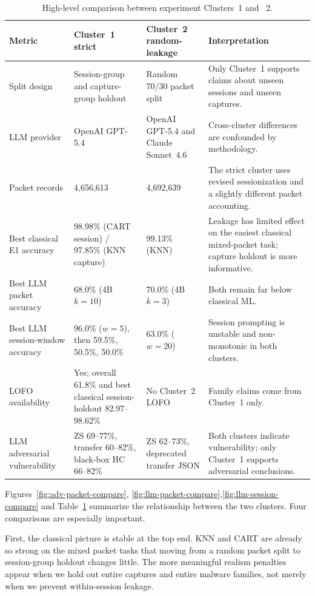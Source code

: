 \documentclass[letterpaper,twocolumn,10pt]{article}
\begin{document}
\begin{table}[t]
\centering
\caption{High-level comparison between experiment Clusters~1 and ~2.}
\label{tab:cluster-compare}
\footnotesize
\begin{tabularx}{\textwidth}{p{3.2cm}p{3.0cm}p{3.0cm}X}
\toprule
Metric & Cluster~1 strict & Cluster~2 random-leakage & Interpretation \\
\midrule
Split design & Session-group and capture-group holdout & Random 70/30 packet split & Only Cluster~1 supports claims about unseen sessions and unseen captures. \\
LLM provider & OpenAI GPT-5.4 & {OpenAI GPT-5.4 and Claude Sonnet~4.6} & Cross-cluster differences are confounded by methodology. \\
Packet records & 4{,}656{,}613 & 4{,}692{,}639 & The strict cluster uses revised sessionization and a slightly different packet accounting. \\
Best classical E1 accuracy & 98.98\% (CART session) / 97.85\% (KNN capture) & 99.13\% (KNN) & Leakage has limited effect on the easiest classical mixed-packet task; capture holdout is more informative. \\
Best LLM packet accuracy & 68.0\% (4B $k=10$) & 70.0\% (4B $k=3$) & Both remain far below classical ML. \\
Best LLM session-window accuracy & 96.0\% ($w=5$), then 59.5\%, 50.5\%, 50.0\% & 63.0\% ($w=20$) & Session prompting is unstable and non-monotonic in both clusters. \\
LOFO availability & Yes; overall 61.8\% and best classical session-holdout 82.97--98.62\% & No Cluster~2 LOFO & Family claims come from Cluster~1 only. \\
LLM adversarial vulnerability & ZS 69--77\%, transfer 60--82\%, black-box HC 66--82\% & ZS 62--73\%, deprecated transfer JSON & Both clusters indicate vulnerability; only Cluster~1 supports adversarial conclusions. \\
\bottomrule
\end{tabularx}
\end{table}

Figures~\ref{fig:adv-packet-compare}, \ref{fig:llm-packet-compare},\ref{fig:llm-session-compare} and Table~\ref{tab:cluster-compare} summarize the relationship between the two clusters. Four comparisons are especially important.

First, the classical picture is stable at the top end. KNN and CART are already so strong on the mixed packet tasks that moving from a random packet split to session-group holdout changes little. The more meaningful realism penalties appear when we hold out entire captures and entire malware families, not merely when we prevent within-session leakage.
\end{document}
